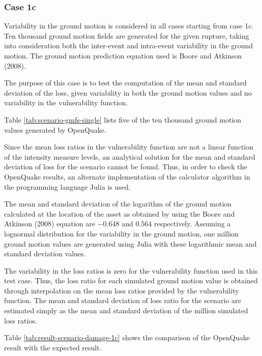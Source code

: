\subsubsection{Case 1c}
Variability in the ground motion is considered in all cases starting from case 1c. Ten thousand ground motion fields are generated for the given rupture, taking into consideration both the inter-event and intra-event variability in the ground motion. The ground motion prediction equation used is Boore and Atkinson (2008).

The purpose of this case is to test the computation of the mean and standard deviation of the loss, given variability in both the ground motion values and no variability in the vulnerability function.



Table \ref{tab:scenario-gmfs-single} lists five of the ten thousand ground motion values generated by OpenQuake.

Since the mean loss ratios in the vulnerability function are not a linear function of the intensity measure levels, an analytical solution for the mean and standard deviation of loss for the scenario cannot be found. Thus, in order to check the OpenQuake results, an alternate implementation of the calculator algorithm in the programming language Julia is used.

The mean and standard deviation of the logarithm of the ground motion calculated at the location of the asset as obtained by using the Boore and Atkinson (2008) equation are $-0.648$ and $0.564$ respectively. Assuming a lognormal distribution for the variability in the ground motion, one million ground motion values are generated using Julia with these logarithmic mean and standard deviation values.

The variability in the loss ratios is zero for the vulnerability function used in this test case. Thus, the loss ratio for each simulated ground motion value is obtained through interpolation on the mean loss ratios provided by the vulnerability function. The mean and standard deviation of loss ratio for the scenario are estimated simply as the mean and standard deviation of the million simulated loss ratios.



Table \ref{tab:result-scenario-damage-1c} shows the comparison of the OpenQuake result with the expected result.


